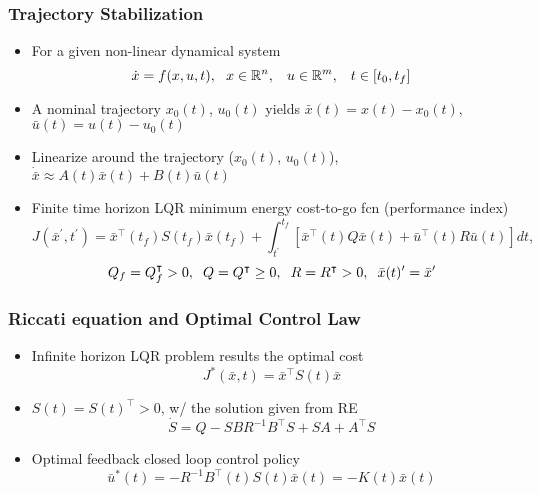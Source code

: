 \documentclass{beamer}
\begin{document}
\begin{frame}
\frametitle{Trajectory Stabilization}
\begin{itemize}
\item For a given non-linear dynamical system
\begin{equation*}
\dot{x} = f(x,u,t), \hspace{.23cm} x\in \mathbb{R}^n, \hspace{.3cm} u\in \mathbb{R}^m, \hspace{.3cm} t \in [t_0, t_f]
\end{equation*} 
\item A nominal trajectory $x_0(t)$, $u_0(t)$ yields $\bar{x}(t)=x(t)-x_0(t)$, $\bar{u}(t)=u(t)-u_0(t)$
\item Linearize around the trajectory ($x_0(t)$, $u_0(t)$), $\dot{\bar{x}}\approx A(t)\bar{x}(t)+B(t)\bar{u}(t)$ 
\item Finite time horizon LQR minimum energy cost-to-go fcn (performance index)
\begin{equation*}
J({\bar{x}^{\prime}, t^{\prime}})= \bar{x}^{\intercal}(t_f)S(t_f)\bar{x}(t_f)+  \int_{t^{\prime}}^{t_f} [ \bar{x}^{\intercal}(t)Q\bar{x}(t)+\bar{u}^{\intercal}(t)R\bar{u}(t)]dt,
\end{equation*}
\begin{equation*}
Q_f=Q_f^{\intercal}> 0, \hspace{.2cm} Q=Q^{\intercal}\geq 0, \hspace{.2cm} R=R^{\intercal}> 0, \hspace{.2cm} \bar{x}(t)^{\prime}=\bar{x}^{\prime}
\end{equation*}
\end{itemize}
\end{frame}


\begin{frame}
\frametitle{Riccati equation and Optimal Control Law}
\begin{itemize}
\item Infinite horizon LQR problem results the optimal cost
\begin{equation*}
J^{\ast}(\bar{x},t)=\bar{x}^{\intercal}S(t)\bar{x}
\end{equation*} 
\item $S(t)=S(t)^{\intercal} > 0$, w/ the solution given from RE
\begin{equation*}
\dot{S}=Q-SBR^{-1}B^{\intercal}S+SA+A^{\intercal}S
\end{equation*}
\item Optimal feedback closed loop control policy 
\begin{equation*}
\bar{u}^{\ast}(t)=-R^{-1}B^{\intercal}(t)S(t)\bar{x}(t)=-K(t)\bar{x}(t)
\end{equation*}
\end{itemize}
\end{frame}
\end{document}
